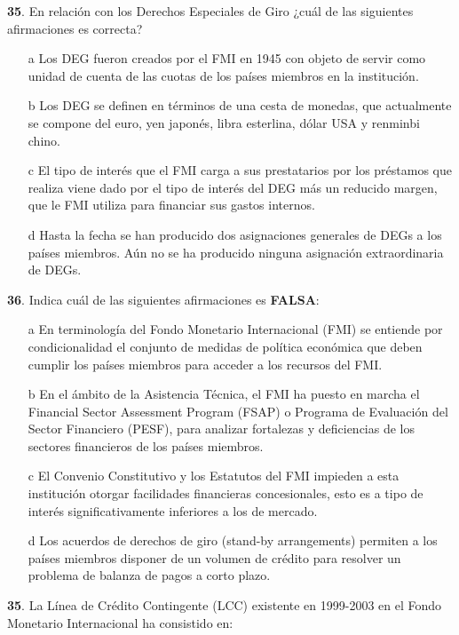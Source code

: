 \documentclass{nuevotema}
\begin{document}
\textbf{35}. En relación con los Derechos Especiales de Giro ¿cuál de las siguientes afirmaciones es correcta?

\begin{enumerate}
	\item[a] Los DEG fueron creados por el FMI en 1945 con objeto de servir como unidad de cuenta de las cuotas de los países miembros en la institución.
	\item[b] Los DEG se definen en términos de una cesta de monedas, que actualmente se compone del euro, yen japonés, libra esterlina, dólar USA y renminbi chino.
	\item[c] El tipo de interés que el FMI carga a sus prestatarios por los préstamos que realiza viene dado por el tipo de interés del DEG más un reducido margen, que le FMI utiliza para financiar sus gastos internos. 
	\item[d] Hasta la fecha se han producido dos asignaciones generales de DEGs a los países miembros. Aún no se ha producido ninguna asignación extraordinaria de DEGs.
\end{enumerate}

\textbf{36}. Indica cuál de las siguientes afirmaciones es \textbf{FALSA}:

\begin{enumerate}
	\item[a] En terminología del Fondo Monetario Internacional (FMI) se entiende por condicionalidad el conjunto de medidas de política económica que deben cumplir los países miembros para acceder a los recursos del FMI.
	\item[b] En el ámbito de la Asistencia Técnica, el FMI ha puesto en marcha el Financial Sector Assessment Program (FSAP) o Programa de Evaluación del Sector Financiero (PESF), para analizar fortalezas y deficiencias de los sectores financieros de los países miembros.
	\item[c] El Convenio Constitutivo y los Estatutos del FMI impieden a esta institución otorgar facilidades financieras concesionales, esto es a tipo de interés significativamente inferiores a los de mercado.
	\item[d] Los acuerdos de derechos de giro (stand-by arrangements) permiten a los países miembros disponer de un volumen de crédito para resolver un problema de balanza de pagos a corto plazo.
\end{enumerate}

\textbf{35}. La Línea de Crédito Contingente (LCC) existente en 1999-2003 en el Fondo Monetario Internacional ha consistido en:
\end{document}
